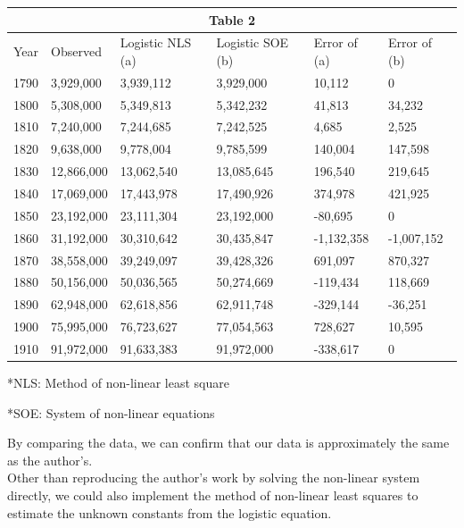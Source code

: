 \documentclass[a4paper]{article}
\begin{document}
\begin{center}
\begin{tabular}{ |p{1cm}|p{1.8cm}|p{1.8cm}|p{1.8cm}|p{1.9cm}|p{1.9cm}| }
 \hline
 \multicolumn{6}{|c|}{Table 2}\\
 \hline
 Year & Observed & Logistic NLS (a) & Logistic SOE (b)& Error of (a) & Error of (b) \\
 \hline
 1790 & 3,929,000 & 3,939,112 &3,929,000 & 10,112 &0\\
 1800 & 5,308,000 & 5,349,813 &5,342,232 & 41,813 &34,232\\
 1810 & 7,240,000 & 7,244,685 &7,242,525 & 4,685 &2,525\\
 1820 & 9,638,000 & 9,778,004 &9,785,599 & 140,004 &147,598\\
 1830 & 12,866,000 & 13,062,540 &13,085,645 & 196,540 &219,645\\
 1840 & 17,069,000 & 17,443,978 &17,490,926 & 374,978 &421,925\\
 1850 & 23,192,000 & 23,111,304 &23,192,000 & -80,695 &0\\
 1860 & 31,192,000 & 30,310,642 &30,435,847 & -1,132,358 &-1,007,152\\
 1870 & 38,558,000 & 39,249,097 &39,428,326 & 691,097 &870,327\\
 1880 & 50,156,000 & 50,036,565 &50,274,669 & -119,434 &118,669\\
 1890 & 62,948,000 & 62,618,856 &62,911,748 & -329,144 &-36,251\\
 1900 & 75,995,000 & 76,723,627 &77,054,563 & 728,627 &10,595\\
 1910 & 91,972,000 & 91,633,383 &91,972,000 & -338,617 &0\\
 \hline
\end{tabular}
\end{center}

\begin{flushleft}
\footnotesize{*NLS: Method of non-linear least square} \

\footnotesize{*SOE: System of non-linear equations}\\
\end{flushleft}

By comparing the data, we can confirm that our data is approximately the same as the author's.\\

Other than reproducing the author's work by solving the non-linear system directly, we could also implement the method of  non-linear least squares to estimate the unknown constants from the logistic equation. \
\end{document}

